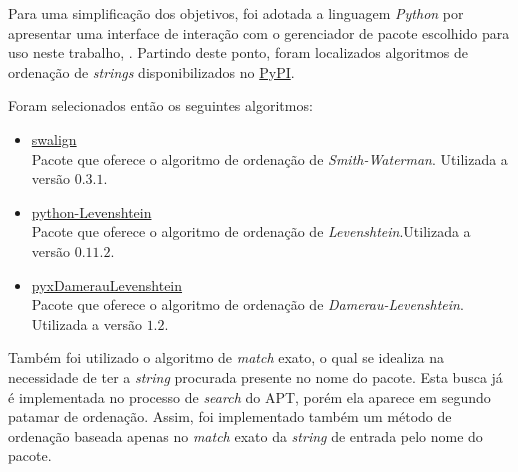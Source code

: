 Para uma simplificação dos objetivos, foi adotada a linguagem \textit{Python} por apresentar uma interface de interação com o gerenciador de pacote escolhido para uso neste trabalho, . Partindo deste ponto, foram localizados algoritmos de ordenação de \textit{strings} disponibilizados no \href{https://pypi.python.org/}{PyPI}.

Foram selecionados então os seguintes algoritmos:

\begin{itemize}
	\item \href{https://pypi.python.org/pypi/swalign/}{swalign}\\
	Pacote que oferece o algoritmo de ordenação de \textit{Smith-Waterman}. Utilizada a versão $0.3.1$.
	\item \href{https://pypi.python.org/pypi/python-Levenshtein/}{python-Levenshtein}\\
	Pacote que oferece o algoritmo de ordenação de \textit{Levenshtein}.Utilizada a versão $0.11.2$.
	\item \href{https://pypi.python.org/pypi/pyxDamerauLevenshtein/}{pyxDamerauLevenshtein}\\
	Pacote que oferece o algoritmo de ordenação de \textit{Damerau-Levenshtein}. Utilizada a versão $1.2$.
\end{itemize}

Também foi utilizado o algoritmo de \textit{match} exato, o qual se idealiza na necessidade de ter a \textit{string} procurada presente no nome do pacote. Esta busca já é implementada no processo de \textit{search} do APT, porém ela aparece em segundo patamar de ordenação. Assim, foi implementado também um método de ordenação baseada apenas no \textit{match} exato  da \textit{string} de entrada pelo nome do pacote.



